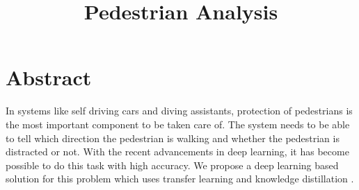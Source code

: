 \documentclass[extendedabs]{bmvc2k}
\begin{document}
\title{Pedestrian Analysis}

%

 

\maketitle


\section{Abstract}
In systems like self driving cars and diving assistants, protection of pedestrians is the most important component to be taken care of. The system needs to be able to tell which direction the pedestrian is walking and whether the pedestrian is distracted or not. With the recent advancements in deep learning, it has become possible to do this task with high accuracy. We propose a deep learning based solution for this problem which uses transfer learning and knowledge distillation \cite{hinton2015distilling}.
\end{document}
